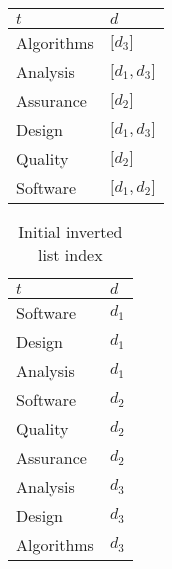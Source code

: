 \begin{ex}
\begin{table}[!ht]
\begin{subtable}[b]{0.3\textwidth}
				\label{tbl:inverted-list-index-sorted}
			\end{subtable}
			
			\begin{subtable}[b]{0.3\textwidth}
				\begin{tabular}{ll}
					\toprule
					$t$ & $d$ \\
					\midrule
					Algorithms & $\lbrack d_3\rbrack$ \\
					Analysis & $\lbrack d_1, d_3\rbrack$ \\
					Assurance & $\lbrack d_2\rbrack$ \\
					Design & $\lbrack d_1, d_3\rbrack$ \\
					Quality & $\lbrack d_2\rbrack$ \\
					Software & $\lbrack d_1, d_2\rbrack$ \\
					\bottomrule
				\end{tabular}
				
				\label{tbl:inverted-list-index-complete}
			\end{subtable}
		\end{table}
		
		
		\begin{table}[!ht]
			\centering
			
			\begin{tabular}{ll}
				\toprule
				$t$ & $d$ \\
				\midrule
				Software & $d_1$ \\
				Design & $d_1$ \\
				Analysis & $d_1$ \\
				Software & $d_2$ \\
				Quality & $d_2$ \\
				Assurance & $d_2$ \\
				Analysis & $d_3$ \\
				Design & $d_3$ \\
				Algorithms & $d_3$ \\
				\bottomrule
			\end{tabular}
			
			\label{tbl:inverted-list-index-initial}
			\caption{Initial inverted list index}
		\end{table}
		
		\begin{table}[!ht]
			\centering
			

\end{table}
\end{ex}
